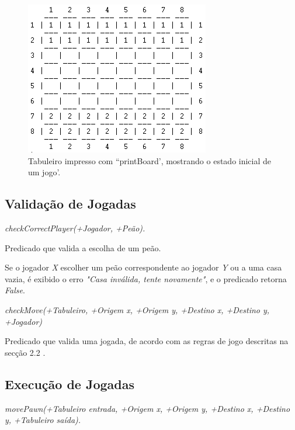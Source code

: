 \documentclass[15pt,a4paper]{article}
\begin{document}
\begin{figure}[h!]
\begin{center}
\includegraphics[scale=1]{fig_tab.png}
\caption{Tabuleiro impresso com ``printBoard', mostrando o estado inicial de um jogo'.}
\label{fig:3}
\end{center}
\end{figure}

\newpage


\subsection{Validação de Jogadas}
 \textit{checkCorrectPlayer(+Jogador, +Peão).}

Predicado que valida a escolha de um peão.

Se o jogador \textit{X} escolher um peão correspondente ao jogador \textit{Y} ou a uma casa vazia, é exibido o erro \textit{"Casa inválida, tente novamente"}, e o predicado retorna \textit{False}.

\textit{ checkMove(+Tabuleiro, +Origem x, +Origem y, +Destino x, +Destino y, +Jogador) }

Predicado que valida uma jogada, de acordo com as regras de jogo descritas na secção 2.2 .


\subsection{Execução de Jogadas}

\textit{movePawn(+Tabuleiro entrada, +Origem x, +Origem y, +Destino x, +Destino y, +Tabuleiro saída).}
\end{document}

